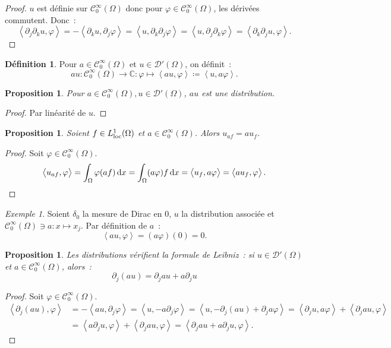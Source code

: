 \documentclass{report}
\newcommand{\C}{{\mathbb C}}
\newcommand{\scpr}[2]{\left\langle#1, #2\right\rangle}
\newcommand{\loc}{{\text{\textnormal{loc}}}}
\newtheorem{prp}[thm]{Proposition}
\theoremstyle{definition}
\newtheorem{déf}[thm]{Définition}
\theoremstyle{remark}
\newtheorem{ex}{Exemple}[chapter]
\begin{document}
\begin{proof} $u$ est définie sur $\mathcal C^\infty_0(\Omega)$ donc pour $\varphi \in \mathcal C^\infty_0(\Omega)$, les dérivées commutent. Donc~:
\[\scpr {\partial_j\partial_ku}\varphi = -\scpr {\partial_ku}{\partial_j\varphi} = \scpr u{\partial_k\partial_j\varphi} = \scpr u{\partial_j\partial_k\varphi}
= \scpr {\partial_k\partial_ju}\varphi.\]
\end{proof}

\begin{déf} Pour $a \in \mathcal C^\infty_0(\Omega)$ et $u \in \mathcal D'(\Omega)$, on définit~:
\[au : \mathcal C^\infty_0(\Omega) \to \C : \varphi \mapsto \scpr {au}\varphi \coloneqq \scpr u{a\varphi}.\]
\end{déf}

\begin{prp} Pour $a \in \mathcal C^\infty_0(\Omega), u \in \mathcal D'(\Omega)$, $au$ est une distribution.
\end{prp}

\begin{proof} Par linéarité de $u$.
\end{proof}

\begin{prp} Soient $f \in L^1_\loc(\Omega)$ et $a \in \mathcal C^\infty_0(\Omega)$. Alors $u_{af} = au_f$.
\end{prp}

\begin{proof} Soit $\varphi \in \mathcal C^\infty_0(\Omega)$.
\[\scpr {u_{af}}\varphi = \int_\Omega \varphi (af)\dif x = \int_\Omega(a\varphi)f\dif x = \scpr {u_f}{a\varphi} = \scpr {au_f}\varphi.\]
\end{proof}

\begin{ex} Soient $\delta_0$ la mesure de Dirac en 0, $u$ la distribution associée et $\mathcal C^\infty_0(\Omega) \ni a : x \mapsto x_j$. Par définition de $a$~:
\[\scpr {au}\varphi = (a\varphi)(0) = 0.\]
\end{ex}

\begin{prp} Les distributions vérifient la formule de Leibniz~: si $u \in \mathcal D'(\Omega)$ et $a \in \mathcal C^\infty_0(\Omega)$, alors~:
\[\partial_j(au) = \partial_jau + a\partial_ju\]
\end{prp}

\begin{proof} Soit $\varphi \in \mathcal C^\infty_0(\Omega)$.
\begin{align*}
	\scpr {\partial_j(au)}\varphi &= -\scpr {au}{\partial_j\varphi} = \scpr u{-a\partial_j\varphi} = \scpr u{-\partial_j(au)+\partial_ja\varphi}
		= \scpr {\partial_ju}{a\varphi} + \scpr{\partial_jau}\varphi \\
	&= \scpr {a\partial_ju}\varphi + \scpr {\partial_jau}\varphi = \scpr {\partial_jau + a\partial_ju}\varphi.
\end{align*}
\end{proof}
\end{document}
